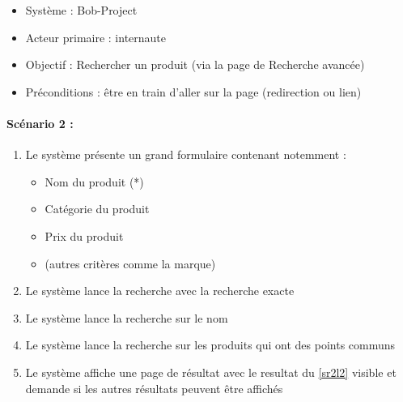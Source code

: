 \begin{boxedminipage}[t]{12cm}
	\begin{itemize}
		\item Système : Bob-Project
		\item Acteur primaire : internaute
		\item Objectif : Rechercher un produit (via la page de Recherche avancée)
		\item Préconditions : être en train d'aller sur la page (redirection ou lien)
	\end{itemize}

	\renewcommand\theenumi{\arabic{enumi}}
	\renewcommand\labelenumi{\theenumi .}
	\renewcommand\theenumii{\Alph{enumii}}
	\renewcommand\labelenumii{(\theenumii)}
	\paragraph*{Scénario 2 :}
	\begin{enumerate}
		\item \label{sr2l1} Le système présente un grand formulaire contenant notemment :
			\begin{itemize}
				\item Nom du produit (*)
				\item Catégorie du produit
				\item Prix du produit
				\item (autres critères comme la marque)
			\end{itemize}
		\item \label{sr2l2} Le système lance la recherche avec la recherche exacte
		\item \label{sr2l3} Le système lance la recherche sur le nom
		\item \label{sr2l4} Le système lance la recherche sur les produits qui ont des points communs
		\item \label{sr2l5} Le système affiche une page de résultat avec le resultat du \ref{sr2l2} visible et demande si les autres résultats peuvent être affichés
	\end{enumerate}

	\renewcommand\theenumi{\Alph{enumi}}
	\renewcommand\labelenumi{\theenumi )}
	\renewcommand\theenumii{\arabic{enumii}}
	\renewcommand\labelenumii{\theenumii .}

\end{boxedminipage}
